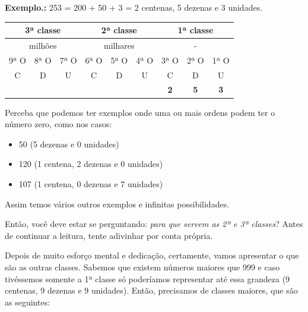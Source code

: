 \textbf{Exemplo.:} 253 = 200 + 50 + 3 = 2 centenas, 5 dezenas e 3 unidades.

\begin{table}[H]
\begin{tabular}{|ccc|ccc|ccc|}
\hline
\multicolumn{3}{|c|}{3ª classe} & \multicolumn{3}{c|}{2ª classe} & \multicolumn{3}{c|}{1ª classe} \\ \hline
\multicolumn{3}{|c|}{milhões} & \multicolumn{3}{c|}{milhares} & \multicolumn{3}{c|}{-} \\ \hline
\multicolumn{1}{|c|}{9ª O} & \multicolumn{1}{c|}{8ª O} & 7ª O & \multicolumn{1}{c|}{6ª O} & \multicolumn{1}{c|}{5ª O} & 4ª O & \multicolumn{1}{c|}{3ª O} & \multicolumn{1}{c|}{2ª O} & 1ª O \\ \hline
\multicolumn{1}{|c|}{C} & \multicolumn{1}{c|}{D} & U & \multicolumn{1}{c|}{C} & \multicolumn{1}{c|}{D} & U & \multicolumn{1}{c|}{C} & \multicolumn{1}{c|}{D} & U \\ \hline
\rowcolor[HTML]{FFFC9E} 
\multicolumn{1}{|c|}{\cellcolor[HTML]{FFFC9E}} & \multicolumn{1}{c|}{\cellcolor[HTML]{FFFC9E}} &  & \multicolumn{1}{c|}{\cellcolor[HTML]{FFFC9E}} & \multicolumn{1}{c|}{\cellcolor[HTML]{FFFC9E}} &  & \multicolumn{1}{c|}{\cellcolor[HTML]{FFFC9E}\textbf{2}} & \multicolumn{1}{c|}{\cellcolor[HTML]{FFFC9E}\textbf{5}} & \textbf{3} \\ \hline
\end{tabular}
\end{table}

Perceba que podemos ter exemplos onde uma ou mais ordens podem ter o número zero, como nos casos:

\begin{itemize}
    \item 50 (5 dezenas e 0 unidades)
    \item 120 (1 centena, 2 dezenas e 0 unidades)
    \item 107 (1 centena, 0 dezenas e 7 unidades)
\end{itemize}

Assim temos vários outros exemplos e infinitas possibilidades.

Então, você deve estar se perguntando: \textit{para que servem as 2ª e 3ª classes}? Antes de continuar a leitura, tente adivinhar por conta própria.

Depois de muito esforço mental e dedicação, certamente, vamos apresentar o que são as outras classes. Sabemos que existem números maiores que 999 e caso tivéssemos somente a 1ª classe só poderíamos representar até essa grandeza (9 centenas, 9 dezenas e 9 unidades). Então, precisamos de classes maiores, que são as seguintes:

